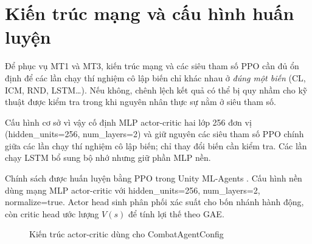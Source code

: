 \section{Kiến trúc mạng và cấu hình huấn luyện}

Để phục vụ MT1 và MT3, kiến trúc mạng và các siêu tham số PPO cần đủ ổn định để các lần chạy thí nghiệm cô lập biến chỉ khác nhau ở \emph{đúng một biến} (CL, ICM, RND, LSTM\dots). Nếu không, chênh lệch kết quả có thể bị quy nhầm cho kỹ thuật được kiểm tra trong khi nguyên nhân thực sự nằm ở siêu tham số.

Cấu hình cơ sở vì vậy cố định MLP actor-critic hai lớp 256 đơn vị (hidden\_units=256, num\_layers=2) và giữ nguyên các siêu tham số PPO chính giữa các lần chạy thí nghiệm cô lập biến; chỉ thay đổi biến cần kiểm tra. Các lần chạy LSTM bổ sung bộ nhớ nhưng giữ phần MLP nền.

Chính sách được huấn luyện bằng PPO trong Unity ML-Agents \cite{Juliani2018}. Cấu hình nền dùng mạng MLP actor-critic với hidden\_units=256, num\_layers=2, normalize=true. Actor head sinh phân phối xác suất cho bốn nhánh hành động, còn critic head ước lượng $V(s)$ để tính lợi thế theo GAE.

\begin{figure}[H]
    \centering
    \caption{Kiến trúc actor-critic dùng cho CombatAgentConfig}
    \label{fig:actor_critic_architecture}
\end{figure}

